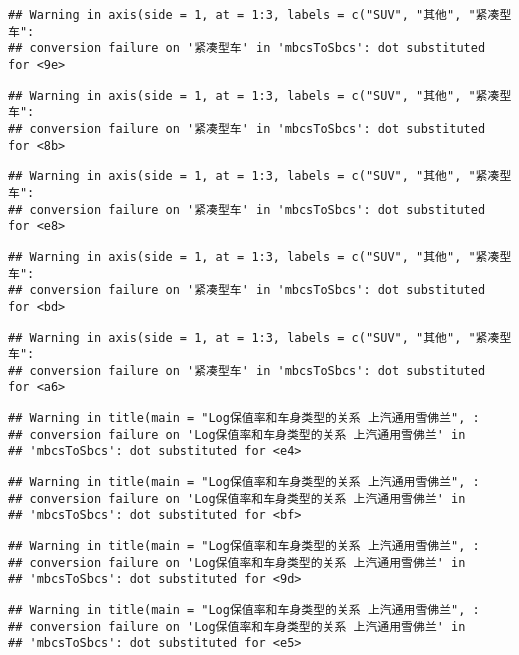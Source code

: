\documentclass[]{article}
\begin{document}
\begin{verbatim}
## Warning in axis(side = 1, at = 1:3, labels = c("SUV", "其他", "紧凑型车":
## conversion failure on '紧凑型车' in 'mbcsToSbcs': dot substituted for <9e>
\end{verbatim}

\begin{verbatim}
## Warning in axis(side = 1, at = 1:3, labels = c("SUV", "其他", "紧凑型车":
## conversion failure on '紧凑型车' in 'mbcsToSbcs': dot substituted for <8b>
\end{verbatim}

\begin{verbatim}
## Warning in axis(side = 1, at = 1:3, labels = c("SUV", "其他", "紧凑型车":
## conversion failure on '紧凑型车' in 'mbcsToSbcs': dot substituted for <e8>
\end{verbatim}

\begin{verbatim}
## Warning in axis(side = 1, at = 1:3, labels = c("SUV", "其他", "紧凑型车":
## conversion failure on '紧凑型车' in 'mbcsToSbcs': dot substituted for <bd>
\end{verbatim}

\begin{verbatim}
## Warning in axis(side = 1, at = 1:3, labels = c("SUV", "其他", "紧凑型车":
## conversion failure on '紧凑型车' in 'mbcsToSbcs': dot substituted for <a6>
\end{verbatim}

\begin{verbatim}
## Warning in title(main = "Log保值率和车身类型的关系 上汽通用雪佛兰", :
## conversion failure on 'Log保值率和车身类型的关系 上汽通用雪佛兰' in
## 'mbcsToSbcs': dot substituted for <e4>
\end{verbatim}

\begin{verbatim}
## Warning in title(main = "Log保值率和车身类型的关系 上汽通用雪佛兰", :
## conversion failure on 'Log保值率和车身类型的关系 上汽通用雪佛兰' in
## 'mbcsToSbcs': dot substituted for <bf>
\end{verbatim}

\begin{verbatim}
## Warning in title(main = "Log保值率和车身类型的关系 上汽通用雪佛兰", :
## conversion failure on 'Log保值率和车身类型的关系 上汽通用雪佛兰' in
## 'mbcsToSbcs': dot substituted for <9d>
\end{verbatim}

\begin{verbatim}
## Warning in title(main = "Log保值率和车身类型的关系 上汽通用雪佛兰", :
## conversion failure on 'Log保值率和车身类型的关系 上汽通用雪佛兰' in
## 'mbcsToSbcs': dot substituted for <e5>
\end{verbatim}
\end{document}
